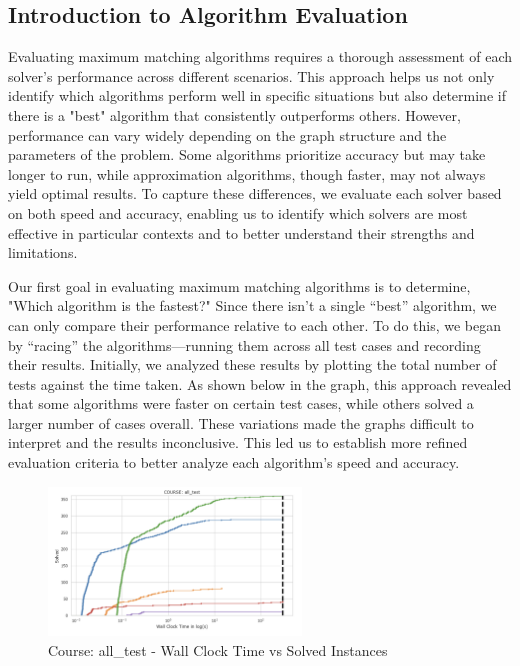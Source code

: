 \subsection*{Introduction to Algorithm Evaluation}
Evaluating maximum matching algorithms requires a thorough assessment of each solver's performance across different scenarios. This approach helps us not only identify which algorithms perform well in specific situations but also determine if there is a "best" algorithm that consistently outperforms others. However, performance can vary widely depending on the graph structure and the parameters of the problem. Some algorithms prioritize accuracy but may take longer to run, while approximation algorithms, though faster, may not always yield optimal results. To capture these differences, we evaluate each solver based on both speed and accuracy, enabling us to identify which solvers are most effective in particular contexts and to better understand their strengths and limitations.

Our first goal in evaluating maximum matching algorithms is to determine, "Which algorithm is the fastest?" Since there isn’t a single “best” algorithm, we can only compare their performance relative to each other. To do this, we began by “racing” the algorithms—running them across all test cases and recording their results. Initially, we analyzed these results by plotting the total number of tests against the time taken. As shown below in the graph, this approach revealed that some algorithms were faster on certain test cases, while others solved a larger number of cases overall. These variations made the graphs difficult to interpret and the results inconclusive. This led us to establish more refined evaluation criteria to better analyze each algorithm’s speed and accuracy.

\begin{figure}[h!]
    \centering
    \includegraphics[width=0.6\textwidth]{all_test_course.png}
    \caption{Course: all\_test - Wall Clock Time vs Solved Instances}
    \label{fig:all_test_course}
\end{figure}

